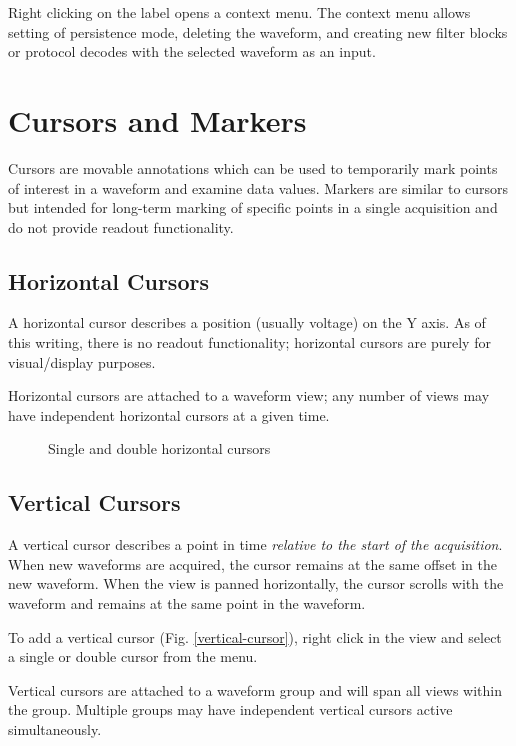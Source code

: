 Right clicking on the label opens a context menu. The context menu allows setting of persistence mode, deleting the
waveform, and creating new filter blocks or protocol decodes with the selected waveform as an input.

\section{Cursors and Markers}
\label{sec:cursors}

Cursors are movable annotations which can be used to temporarily mark points of interest in a waveform and examine data
values. Markers are similar to cursors but intended for long-term marking of specific points in a single acquisition
and do not provide readout functionality.

\subsection{Horizontal Cursors}

A horizontal cursor describes a position (usually voltage) on the Y axis. As of this writing, there is no readout functionality; horizontal cursors are purely for visual/display purposes.

Horizontal cursors are attached to a waveform view; any number of views may have independent horizontal cursors at a given time.

\begin{figure}[H]
\centering
{}
\caption{Single and double horizontal cursors}
\label{horizontal-cursors}
\end{figure}

\subsection{Vertical Cursors}

A vertical cursor describes a point in time \emph{relative to the start of the acquisition}. When new waveforms are
acquired, the cursor remains at the same offset in the new waveform. When the view is panned horizontally, the cursor
scrolls with the waveform and remains at the same point in the waveform.

To add a vertical cursor (Fig. \ref{vertical-cursor}), right click in the view and select a single or double cursor
from the  menu.

Vertical cursors are attached to a waveform group and will span all views within the group. Multiple groups may have
independent vertical cursors active simultaneously.

